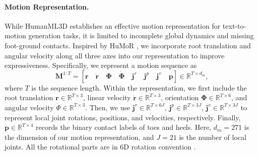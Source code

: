 \paragraph{Motion Representation.} While HumanML3D \cite{Guo_2022_CVPR} establishes an effective motion representation for text-to-motion generation tasks, it is limited to incomplete global dynamics and missing foot-ground contacts. Inspired by HuMoR \cite{rempe2021humor}, we incorporate root translation and angular velocity along all three axes into our representation to improve expressiveness. Specifically, we represent a motion sequence as
\begin{equation}
    \mathbf M^{1:T} = \left[
        \mathbf r
        \quad \dot{\mathbf{r}}
        \quad \mathbf \Phi 
        \quad \dot{\mathbf{\Phi}}
        \quad \mathbf{j}^r
        \quad \mathbf{j}^p
        \quad \mathbf{j}^v
        \quad \mathbf{p}
    \right] \in \mathbb{R}^{T\times d_m}\text{,}
\end{equation}
where $T$ is the sequence length. Within the representation, we first include the root translation $\mathbf r\in\mathbb R^{T\times3}$, linear velocity $\dot{\mathbf{r}} \in\mathbb R^{T\times3}$, orientation $\mathbf \Phi\in\mathbb R^{T\times6}$, and angular velocity $\dot \Phi\in\mathbb R^{T\times 3}$. Then, we use $\mathbf {j}^r\in \mathbb R^{T\times 6J}$, $\mathbf {j}^p\in\mathbb R^{T\times 3J}$, $\mathbf {j}^v\in\mathbb R^{T\times3J}$ to represent local joint rotations, positions, and velocities, respectively. Finally, $\mathbf p\in \mathbb R^{T\times 4}$ records the binary contact labels of toes and heels. Here, $d_m=271$ is the dimension of our motion representation, and $J=21$ is the number of local joints. All the rotational parts are in 6D rotation convention \cite{zhou2019continuity}.

\vspace{-4mm}
